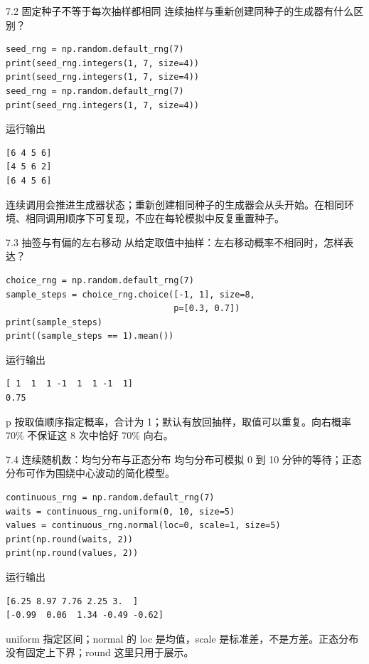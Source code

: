 \documentclass[9pt]{ctexbeamer}
\begin{document}
\begin{frame}[fragile]{7.2 固定种子不等于每次抽样都相同}
\small 连续抽样与重新创建同种子的生成器有什么区别？
\medskip
\begin{lstlisting}
seed_rng = np.random.default_rng(7)
print(seed_rng.integers(1, 7, size=4))
print(seed_rng.integers(1, 7, size=4))
seed_rng = np.random.default_rng(7)
print(seed_rng.integers(1, 7, size=4))
\end{lstlisting}
\begin{exampleblock}{运行输出}
\begin{lstlisting}
[6 4 5 6]
[4 5 6 2]
[6 4 5 6]
\end{lstlisting}
\end{exampleblock}
\small 连续调用会推进生成器状态；重新创建相同种子的生成器会从头开始。在相同环境、相同调用顺序下可复现，不应在每轮模拟中反复重置种子。
\end{frame}

\begin{frame}[fragile]{7.3 抽签与有偏的左右移动}
\small 从给定取值中抽样：左右移动概率不相同时，怎样表达？
\medskip
\begin{lstlisting}
choice_rng = np.random.default_rng(7)
sample_steps = choice_rng.choice([-1, 1], size=8,
                                 p=[0.3, 0.7])
print(sample_steps)
print((sample_steps == 1).mean())
\end{lstlisting}
\begin{exampleblock}{运行输出}
\begin{lstlisting}
[ 1  1  1 -1  1  1 -1  1]
0.75
\end{lstlisting}
\end{exampleblock}
\small p 按取值顺序指定概率，合计为 1；默认有放回抽样，取值可以重复。向右概率 70\% 不保证这 8 次中恰好 70\% 向右。
\end{frame}

\begin{frame}[fragile]{7.4 连续随机数：均匀分布与正态分布}
\small 均匀分布可模拟 0 到 10 分钟的等待；正态分布可作为围绕中心波动的简化模型。
\medskip
\begin{lstlisting}
continuous_rng = np.random.default_rng(7)
waits = continuous_rng.uniform(0, 10, size=5)
values = continuous_rng.normal(loc=0, scale=1, size=5)
print(np.round(waits, 2))
print(np.round(values, 2))
\end{lstlisting}
\begin{exampleblock}{运行输出}
\begin{lstlisting}
[6.25 8.97 7.76 2.25 3.  ]
[-0.99  0.06  1.34 -0.49 -0.62]
\end{lstlisting}
\end{exampleblock}
\small uniform 指定区间；normal 的 loc 是均值，scale 是标准差，不是方差。正态分布没有固定上下界；round 这里只用于展示。
\end{frame}
\end{document}
